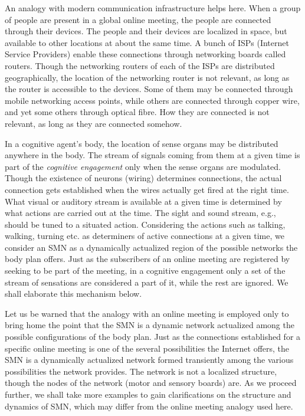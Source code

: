 An analogy with modern communication infrastructure helps here. When a group of people are present in a global online meeting, the people are connected through their devices. The people and their devices are localized in space, but available to other locations at about the same time. A bunch of ISPs (Internet Service Providers) enable these connections through networking boards called routers. Though the networking routers of each of the ISPs are distributed geographically, the location of the networking router is not relevant, as long as the router is accessible to the devices. Some of them may be connected through mobile networking access points, while others are connected through copper wire, and yet some others through optical fibre. How they are connected is not relevant, as long as they are connected somehow.

In a cognitive agent's body, the location of sense organs may be distributed anywhere in the body. The stream of signals coming from them at a given time is part of the \textit{cognitive engagement} only when the sense organs are modulated. Though the existence of neurons (wiring) determines connections, the actual connection gets established when the wires actually get fired at the right time. What visual or auditory stream is available at a given time is determined by what actions are carried out at the time. The sight and sound stream, e.g., should be tuned to a situated action.
Considering the actions such as talking, walking, turning etc. as determiners of active connections at a given time, we consider an SMN as a dynamically actualized region of the possible networks the body plan offers. Just as the subscribers of an online meeting are registered by seeking to be part of the meeting, in a cognitive engagement only a set of the stream of sensations are considered a part of it, while the rest are ignored. We shall elaborate this mechanism below.

Let us be warned that the analogy with an online meeting is employed only to bring home the point that the SMN is a dynamic network actualized among the possible configurations of the body plan. Just as the connections established for a specific online meeting is one of the several possibilities the Internet offers, the SMN is a dynamically actualized network formed transiently among the various possibilities the network provides. The network is not a localized structure, though the nodes of the network (motor and sensory boards) are. As we proceed further, we shall take more examples to gain clarifications on the structure and dynamics of SMN, which may differ from the online meeting analogy used here.

